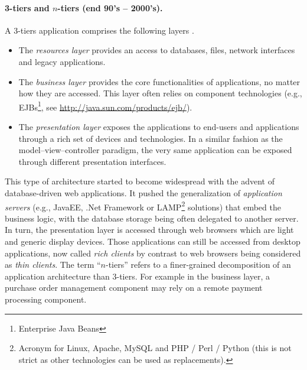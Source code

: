 \paragraph{3-tiers and $n$-tiers (end 90's -- 2000's).}
A 3-tiers application comprises the following layers \cite{HW03}.
\begin{itemize}
  
  \item The \emph{resources layer} provides an access to databases, files, network interfaces and legacy applications.
  
  \item The \emph{business layer} provides the core functionalities of applications, no matter how they are accessed. This layer often relies on component technologies (e.g., EJBs\footnote{Enterprise Java Beans}, see \url{http://java.sun.com/products/ejb/}).
  
  \item The \emph{presentation layer} exposes the applications to end-users and applications through a rich set of devices and technologies. In a similar fashion as the model--view--controller paradigm, the very same application can be exposed through different presentation interfaces.
  
\end{itemize}
This type of architecture started to become widespread with the advent of database-driven web applications. It pushed the generalization of \emph{application servers} (e.g., JavaEE, .Net Framework or LAMP\footnote{Acronym for Linux, Apache, MySQL and PHP / Perl / Python (this is not strict as other technologies can be used as replacements).} solutions) that embed the business logic, with the database storage being often delegated to another server. In turn, the presentation layer is accessed through web browsers which are light and generic display devices. Those applications can still be accessed from desktop applications, now called \emph{rich clients} by contrast to web browsers being considered as \emph{thin clients}. The term ``$n$-tiers'' refers to a finer-grained decomposition of an application architecture than 3-tiers. For example in the business layer, a purchase order management component may rely on a remote payment processing component.

